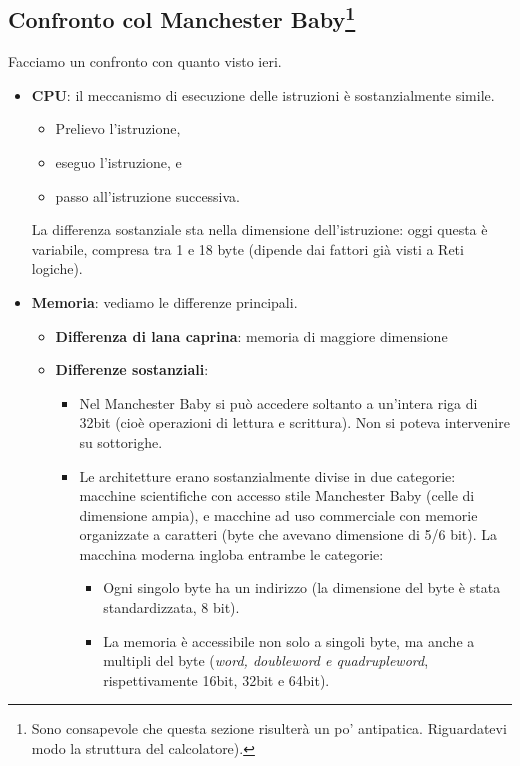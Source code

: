 \documentclass[11pt]{report}
\theoremstyle{definition}
\begin{document}
\subsection[{Confronto col Manchester Baby}]{Confronto col Manchester Baby\footnote{Sono consapevole che questa sezione risulterà un po' antipatica. Riguardatevi modo la struttura del calcolatore). }} Facciamo un confronto con quanto visto ieri.
\begin{itemize}
\item \textbf{CPU}: il meccanismo di esecuzione delle istruzioni è sostanzialmente simile.
\begin{itemize}
\item Prelievo l'istruzione,
\item eseguo l'istruzione, e
\item passo all'istruzione successiva.
\end{itemize}
La differenza sostanziale sta nella dimensione dell'istruzione: oggi questa è variabile, compresa tra 1 e 18 byte (dipende dai fattori già visti a Reti logiche).
\item \textbf{Memoria}: vediamo le differenze principali.
\begin{itemize}
\item \textbf{Differenza di lana caprina}: memoria di maggiore dimensione
\item \textbf{Differenze sostanziali}: 
\begin{itemize}
\item Nel Manchester Baby si può accedere soltanto a un'intera riga di 32bit (cioè operazioni di lettura e scrittura). Non si poteva intervenire su sottorighe.
\item Le architetture erano sostanzialmente divise in due categorie: macchine scientifiche con accesso stile Manchester Baby (celle di dimensione ampia), e macchine ad uso commerciale con memorie organizzate a caratteri (byte che avevano dimensione di 5/6 bit). La macchina moderna ingloba entrambe le categorie:
\begin{itemize}
\item Ogni singolo byte ha un indirizzo (la dimensione del byte è stata standardizzata, 8 bit). 
\item La memoria è accessibile non solo a singoli byte, ma anche a multipli del byte (\emph{word, doubleword e quadrupleword}, rispettivamente 16bit, 32bit e 64bit).
\end{itemize}
\end{itemize}
\end{itemize}

\end{itemize}
\end{document}
